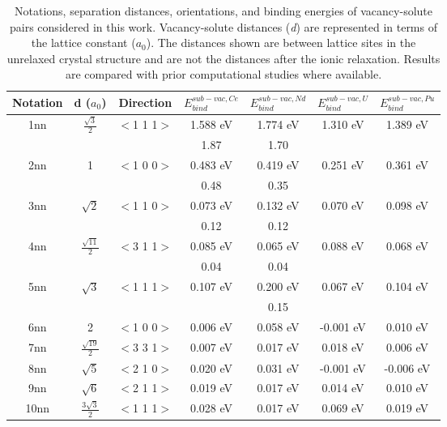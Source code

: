 \documentclass[preprint,12pt]{elsarticle}
\begin{document}
\begin{table}[h]
    \centering
    \caption{Notations, separation distances, orientations, and binding energies of vacancy-solute pairs considered in this work. Vacancy-solute distances (\textit{d}) are represented in terms of the lattice constant ($a_0$). The distances shown are between lattice sites in the unrelaxed crystal structure and are not the distances after the ionic relaxation. Results are compared with prior computational studies where available.}
    \begin{tabular}{|c|c|c|c|c|c|c|}
    \hline
       Notation & d ($a_0$) & Direction&  $E_{bind}^{sub-vac,Ce}$ & $E_{bind}^{sub-vac,Nd}$ &$E_{bind}^{sub-vac,U}$ &$E_{bind}^{sub-vac,Pu}$ \\
        \hline
       1nn &$\frac{\sqrt{3}}{2}$ & $<$1 1 1$>$ &1.588 eV &1.774 eV&1.310 eV&1.389 eV\\
       &&&1.87 \cite{yang_significant_2023} &1.70 \cite{yang_significant_2023} & & \\
       \hline
       2nn &1 & $<$1 0 0$>$ &0.483 eV&0.419 eV&0.251 eV&0.361 eV\\
       &&&0.48 \cite{yang_significant_2023} &0.35 \cite{yang_significant_2023} && \\
       \hline
       3nn &$\sqrt{2}$ &$<$1 1 0$>$  &0.073 eV&0.132 eV&0.070 eV&0.098 eV\\
       &&&0.12 \cite{yang_significant_2023} & 0.12 \cite{yang_significant_2023}&& \\
       \hline
       4nn &$\frac{\sqrt{11}}{2}$ & $<$3 1 1$>$ & 0.085 eV&0.065 eV&0.088 eV&0.068 eV\\
       &&&0.04 \cite{yang_significant_2023} &0.04 \cite{yang_significant_2023} && \\
       \hline
       5nn &$\sqrt{3}$ & $<$1 1 1$>$  & 0.107 eV&0.200 eV&0.067 eV&0.104 eV\\
       &&& &0.15 \cite{yang_significant_2023} && \\
       \hline
       6nn &2 & $<$1 0 0$>$ &0.006 eV&0.058 eV&-0.001 eV&0.010 eV\\
       \hline
       7nn &$\frac{\sqrt{19}}{2}$ & $<$3 3 1$>$ &0.007 eV&0.017 eV&0.018 eV&0.006 eV\\
       \hline
       8nn &$\sqrt{5}$ &$<$2 1 0$>$ &0.020 eV&0.031 eV&-0.001 eV&-0.006 eV\\
       \hline
       9nn &$\sqrt{6}$ & $<$2 1 1$>$  &0.019 eV&0.017 eV&0.014 eV&0.010 eV\\
       \hline
      10nn &$\frac{3\sqrt{3}}{2}$ & $<$1 1 1$>$ &0.028 eV&0.017 eV&0.069 eV&0.019 eV\\
      \hline
    \end{tabular}
    \label{tab:configurations_binding}
\end{table}
\end{document}
